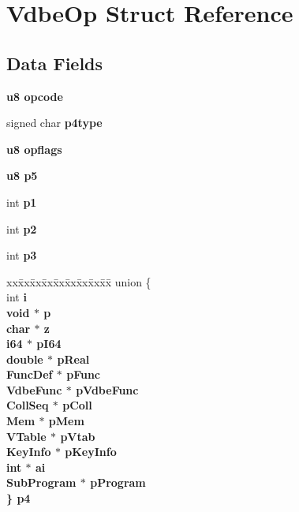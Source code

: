 \section{Vdbe\-Op Struct Reference}
\label{structVdbeOp}
\subsection*{Data Fields}
\begin{CompactItemize}
\item 
\bf{u8} \bf{opcode}
\item 
signed char \bf{p4type}
\item 
\bf{u8} \bf{opflags}
\item 
\bf{u8} \bf{p5}
\item 
int \bf{p1}
\item 
int \bf{p2}
\item 
int \bf{p3}
\item 
\begin{tabbing}
xx\=xx\=xx\=xx\=xx\=xx\=xx\=xx\=xx\=\kill
union \{\\
\>int \bf{i}\\
\>void $\ast$ \bf{p}\\
\>char $\ast$ \bf{z}\\
\>\bf{i64} $\ast$ \bf{pI64}\\
\>double $\ast$ \bf{pReal}\\
\>\bf{FuncDef} $\ast$ \bf{pFunc}\\
\>\bf{VdbeFunc} $\ast$ \bf{pVdbeFunc}\\
\>\bf{CollSeq} $\ast$ \bf{pColl}\\
\>\bf{Mem} $\ast$ \bf{pMem}\\
\>\bf{VTable} $\ast$ \bf{pVtab}\\
\>\bf{KeyInfo} $\ast$ \bf{pKeyInfo}\\
\>int $\ast$ \bf{ai}\\
\>\bf{SubProgram} $\ast$ \bf{pProgram}\\
\} \bf{p4}\\


\end{tabbing}
\end{CompactItemize}
